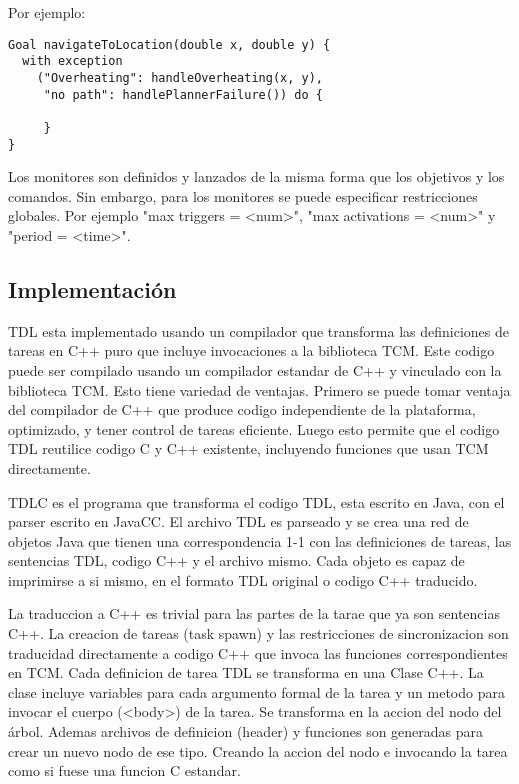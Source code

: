 \documentclass[a4paper, 11pt, oneside]{article}
\begin{document}
Por ejemplo:

\begin{verbatim}
Goal navigateToLocation(double x, double y) {
  with exception
    ("Overheating": handleOverheating(x, y),
     "no path": handlePlannerFailure()) do {

     }
}
\end{verbatim}

Los monitores son definidos y lanzados de la misma forma que los objetivos
y los comandos.
Sin embargo, para los monitores se puede especificar restricciones globales.
Por ejemplo "max triggers = <num>", "max activations = <num>"
y "period = <time>".

\subsection{Implementación}

TDL esta implementado usando un compilador que transforma las definiciones
de tareas en C++ puro que incluye invocaciones a la biblioteca TCM.
Este codigo puede ser compilado usando un compilador estandar de C++ y
vinculado con la biblioteca TCM.
Esto tiene variedad de ventajas. Primero se puede tomar ventaja del
compilador de C++ que produce codigo independiente de la plataforma,
optimizado, y tener control de tareas eficiente.
Luego esto permite que el codigo TDL reutilice codigo C y C++ existente,
incluyendo funciones que usan TCM directamente.

TDLC es el programa que transforma el codigo TDL, esta escrito en Java, con
el parser escrito en JavaCC.
El archivo TDL es parseado y se crea una red de objetos Java que tienen
una correspondencia 1-1 con las definiciones de tareas, las sentencias
TDL, codigo C++ y el archivo mismo.
Cada objeto es capaz de imprimirse a si mismo, en el formato TDL original
o codigo C++ traducido.

La traduccion a C++ es trivial para las partes de la tarae que ya son
sentencias C++.
La creacion de tareas (task spawn) y las restricciones de sincronizacion
son traducidad directamente a codigo C++ que invoca las funciones 
correspondientes en TCM.
Cada definicion de tarea TDL se transforma en una Clase C++.
La clase incluye variables para cada argumento formal de la tarea y
un metodo para invocar el cuerpo (<body>) de la tarea. Se transforma
en la accion del nodo del árbol.
Ademas archivos de definicion (header) y funciones son generadas para
crear un nuevo nodo de ese tipo. Creando la accion del nodo e invocando
la tarea como si fuese una funcion C estandar.
\end{document}
